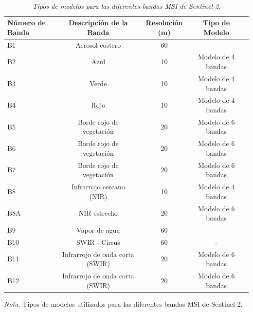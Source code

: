 \begin{table}[H]
    \caption{\doublespacing \\ \textit{Tipos de modelos para las diferentes bandas MSI de Sentinel-2.}}
    \begin{spacing}{8}
        \fontsize{8pt}{2pt}\selectfont  
        \begin{tabularx}{\linewidth}{P{6cm}*{4}{c}} 
            \toprule
            \textbf{Número de Banda} & \textbf{Descripción de la Banda} & \textbf{Resolución (m)} & \textbf{Tipo de Modelo} \\
            \midrule
            B1 & Aerosol costero & 60 & - \\
            B2 & Azul & 10 & Modelo de 4 bandas \\
            B3 & Verde & 10 & Modelo de 4 bandas \\
            B4 & Rojo & 10 & Modelo de 4 bandas \\
            B5 & Borde rojo de vegetación & 20 & Modelo de 6 bandas \\
            B6 & Borde rojo de vegetación & 20 & Modelo de 6 bandas \\
            B7 & Borde rojo de vegetación & 20 & Modelo de 6 bandas \\
            B8 & Infrarrojo cercano (NIR) & 10 & Modelo de 4 bandas \\
            B8A & NIR estrecho & 20 & Modelo de 6 bandas \\
            B9 & Vapor de agua & 60 & - \\
            B10 & SWIR - Cirrus & 60 & - \\
            B11 & Infrarrojo de onda corta (SWIR) & 20 & Modelo de 6 bandas \\
            B12 & Infrarrojo de onda corta (SWIR) & 20 & Modelo de 6 bandas \\
            \bottomrule
        \end{tabularx}
    \end{spacing}
    \vspace{1\baselineskip}
    \textit{Nota.} Tipos de modelos utilizados para las diferentes bandas MSI de Sentinel-2.
    \label{table:sentinel2_bands_model}
\end{table}

